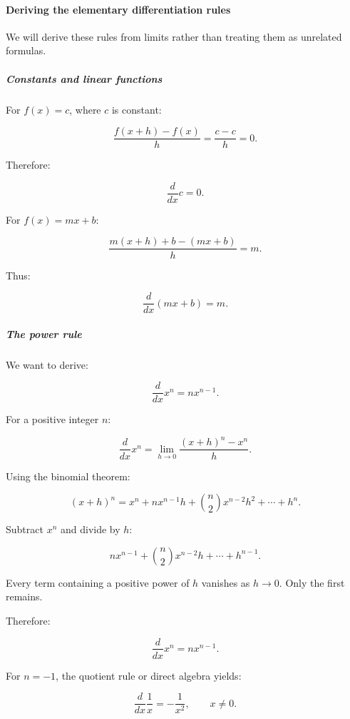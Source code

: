 \paragraph{Deriving the elementary differentiation rules}\label{01-foundations-i-ch020-deriving-the-elementary-differentiation-rules}

\hypertarget{01-foundations-i-ch020-deriving-the-elementary-differentiation-rules}{}

We will derive these rules from limits rather than treating them as unrelated formulas.

\subparagraph{Constants and linear functions}\label{01-foundations-i-ch020-constants-and-linear-functions}

\hypertarget{01-foundations-i-ch020-constants-and-linear-functions}{}

For \(f(x)=c\), where \(c\) is constant:

\[
\frac{f(x+h)-f(x)}h=\frac{c-c}h=0.
\]

Therefore:

\[
\frac d{dx}c=0.
\]

For \(f(x)=mx+b\):

\[
\frac{m(x+h)+b-(mx+b)}h=m.
\]

Thus:

\[
\frac d{dx}(mx+b)=m.
\]

\subparagraph{The power rule}\label{01-foundations-i-ch020-the-power-rule}

\hypertarget{01-foundations-i-ch020-the-power-rule}{}

We want to derive:

\[
\boxed{\frac d{dx}x^n=nx^{n-1}}.
\]

For a positive integer \(n\):

\[
\frac d{dx}x^n = \lim_{h\to0}\frac{(x+h)^n-x^n}{h}.
\]

Using the binomial theorem:

\[
(x+h)^n= x^n+nx^{n-1}h+ \binom n2x^{n-2}h^2+\cdots+h^n.
\]

Subtract \(x^n\) and divide by \(h\):

\[
nx^{n-1}+ \binom n2x^{n-2}h+\cdots+h^{n-1}.
\]

Every term containing a positive power of \(h\) vanishes as \(h\to0\). Only the first remains.

Therefore:

\[
\frac d{dx}x^n=nx^{n-1}.
\]

For \(n=-1\), the quotient rule or direct algebra yields:

\[
\frac d{dx}\frac1x=-\frac1{x^2},\qquad x\ne0.
\]

